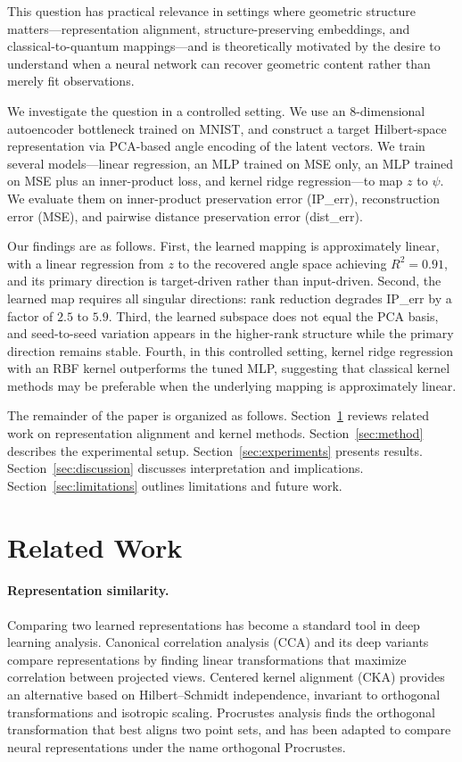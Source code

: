 \documentclass[11pt]{article}
\begin{document}
This question has practical relevance in settings where geometric structure
matters---representation alignment, structure-preserving embeddings, and
classical-to-quantum mappings---and is theoretically motivated by the
desire to understand when a neural network can recover geometric content
rather than merely fit observations.

We investigate the question in a controlled setting. We use an
8-dimensional autoencoder bottleneck trained on MNIST, and construct a
target Hilbert-space representation via PCA-based angle encoding of the
latent vectors. We train several models---linear regression, an MLP trained
on MSE only, an MLP trained on MSE plus an inner-product loss, and kernel
ridge regression---to map $z$ to $\psi$. We evaluate them on inner-product
preservation error (IP\_err), reconstruction error (MSE), and pairwise
distance preservation error (dist\_err).

Our findings are as follows. First, the learned mapping is approximately
linear, with a linear regression from $z$ to the recovered angle space
achieving $R^{2} = 0.91$, and its primary direction is target-driven rather
than input-driven. Second, the learned map requires all singular directions:
rank reduction degrades IP\_err by a factor of $2.5$ to $5.9$. Third, the
learned subspace does not equal the PCA basis, and seed-to-seed variation
appears in the higher-rank structure while the primary direction remains
stable. Fourth, in this controlled setting, kernel ridge regression with an
RBF kernel outperforms the tuned MLP, suggesting that classical kernel
methods may be preferable when the underlying mapping is approximately
linear.

The remainder of the paper is organized as follows. Section~\ref{sec:related}
reviews related work on representation alignment and kernel methods.
Section~\ref{sec:method} describes the experimental setup. Section~\ref{sec:experiments}
presents results. Section~\ref{sec:discussion} discusses interpretation and
implications. Section~\ref{sec:limitations} outlines limitations and future
work.

\section{Related Work}
\label{sec:related}

\paragraph{Representation similarity.} Comparing two learned representations
has become a standard tool in deep learning analysis. Canonical correlation
analysis (CCA) and its deep variants \cite{raghu2017svcca} compare
representations by finding linear transformations that maximize correlation
between projected views. Centered kernel alignment (CKA)
\cite{kornblith2019similarity} provides an alternative based on Hilbert--Schmidt
independence, invariant to orthogonal transformations and isotropic scaling.
Procrustes analysis \cite{gower1975generalized} finds the orthogonal
transformation that best aligns two point sets, and has been adapted to
compare neural representations under the name orthogonal Procrustes.
\end{document}
